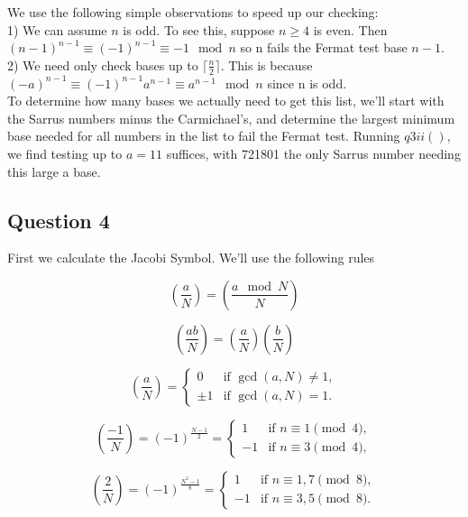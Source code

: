 \documentclass[10pt,a4paper]{report}
\newcommand{\legendre}[2]{(\frac{#1}{#2})}
\begin{document}
We use the following simple observations to speed up our checking:\\

1) We can assume $n$ is odd. To see this, suppose $n\geq4$ is even. Then $(n-1)^{n-1}\equiv (-1)^{n-1}\equiv-1 \mod n$ so n fails the Fermat test base $n-1$.\\

2) We need only check bases up to $\lceil\frac{n}{2}\rceil$. This is because $(-a)^{n-1}\equiv (-1)^{n-1}a^{n-1}\equiv a^{n-1} \mod n$ since n is odd.\\

To determine how many bases we actually need to get this list, we'll start with the Sarrus numbers minus the Carmichael's, and determine the largest minimum base needed for all numbers in the list to fail the Fermat test. Running $q3ii()$, we find testing up to $a=11$ suffices, with 721801 the only Sarrus number needing this large a base.

\subsection*{Question 4}

First we calculate the Jacobi Symbol. We'll use the following rules

\begin{equation*}
\legendre{a}{N} = \legendre{a\mod N}{N}
\tag{1}
\end{equation*}

\begin{equation*}
\legendre{ab}{N} = \legendre{a}{N}\legendre{b}{N}
\tag{2}
\end{equation*}

\begin{equation*}
\legendre{a}{N} =
\begin{cases}
0 & \text{if } \gcd(a,N) \ne 1,\\
\pm1 & \text{if } \gcd(a,N) = 1.
\end{cases}
\tag{3}
\end{equation*}

\begin{equation*}
\legendre{-1}{N} = (-1)^{\frac{N-1}{2}} = \begin{cases} 
1 & \text{if }n \equiv 1 \pmod 4,\\
-1 & \text{if }n \equiv 3 \pmod 4,
\end{cases}
\tag{4}
\end{equation*}

\begin{equation*}
\legendre{2}{N} = (-1)^{\frac{N^2-1}{8}} = \begin{cases} 1 & \text{if }n \equiv 1,7 \pmod 8,\\
-1 & \text{if }n \equiv 3,5\pmod 8.
\end{cases}
\tag{5}
\end{equation*}
\end{document}
